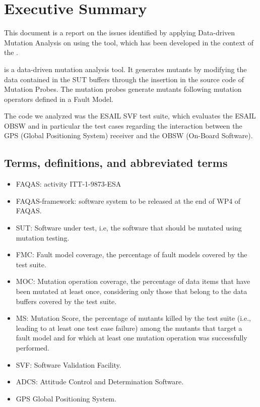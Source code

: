 
\chapter{Executive Summary}

This document is a report on the issues identified by applying Data-driven Mutation Analysis on \case using the \DAMA tool, which has been developed in the context of the \FAQAS.

\DAMA is a data-driven mutation analysis tool. It generates mutants by modifying the data contained in the SUT buffers through the insertion in the source code of Mutation Probes. The mutation probes generate mutants following mutation operators defined in a Fault Model.

The code we analyzed was the ESAIL SVF test suite, which evaluates the ESAIL OBSW and in particular the test cases regarding the interaction between the GPS (Global Positioning System) receiver and the OBSW (On-Board Software).


\section{Terms, definitions, and abbreviated terms}

\begin{itemize}
\item{FAQAS}: activity ITT-1-9873-ESA
\item{FAQAS-framework}: software system to be released at the end of WP4 of FAQAS.
\item{SUT}: Software under test, i.e, the software that should be mutated using mutation testing.
\item{FMC}: Fault model coverage, the percentage of fault models covered by the test suite.
\item{MOC}: Mutation operation coverage, the percentage of data items that have been mutated at least once, considering only those that belong to the data buffers covered by the test suite.
\item{MS}: Mutation Score, the percentage of mutants killed by the test suite (i.e., leading to at least one test case failure) among the mutants that target a fault model and for which at least one mutation operation was successfully performed.
\item{SVF}: Software Validation Facility.
\item{ADCS}: Attitude Control and Determination Software.
\item{GPS} Global Positioning System.

\end{itemize}

\clearpage

